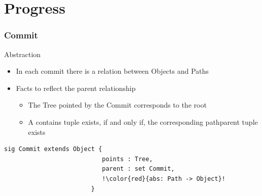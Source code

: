 \documentclass{beamer}
\begin{document}
\section{Progress}
\begin{frame}[fragile]
   \frametitle{Commit}
   \begin{block}{Abstraction}
      \begin{itemize}
         \item In each commit there is a relation between Objects and Paths
         \item Facts to reflect the parent relationship
            \begin{itemize}
               \item The Tree pointed by the Commit corresponds to the root
               \item A contains tuple exists, 
	       if and only if, the corresponding pathparent tuple exists
            \end{itemize}
      \end{itemize}
   \end{block}
   \tiny
   \begin{lstlisting}[escapechar=!]
                        sig Commit extends Object {
                           points : Tree,
                           parent : set Commit,
                           !\color{red}{abs: Path -> Object}!
                        }
  \end{lstlisting}

\end{frame}

\end{document}
